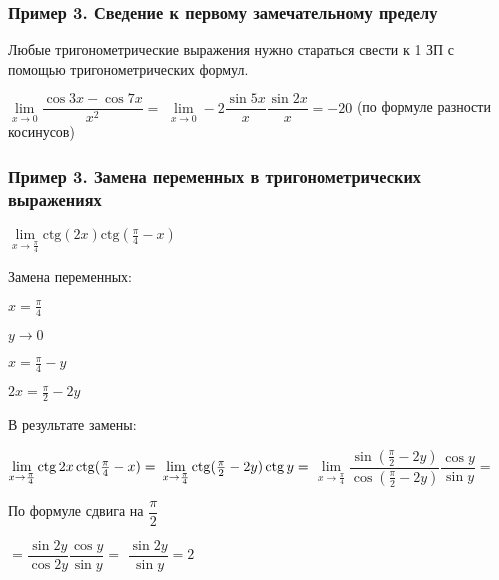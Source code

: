 \subsubsection{Пример 3. Сведение к первому замечательному пределу}

Любые тригонометрические выражения нужно стараться свести к
1 ЗП с помощью тригонометрических формул.

$ \lim\limits_{x\to 0} \dfrac{ \cos{3x} - \cos{7x}}{x^{2}} = $
$ \lim\limits_{x\to 0} -2 \dfrac{\sin{5x}}{x} \dfrac{\sin{2x}}{x} = -20 $
(по формуле разности косинусов)

\subsubsection{Пример 3. Замена переменных в тригонометрических выражениях}

$ \lim\limits_{x\to \frac{\pi}{4} } \mathrm{ctg}(2x)  \mathrm{ctg}( \frac{\pi}{4} - x)  $

Замена переменных:

$ x = \frac{\pi}{4} $

$ y \to 0 $

$ x = \frac{\pi}{4} - y $

$ 2x = \frac{\pi}{2} - 2y $

В результате замены:

$ \lim\limits_{x\to \frac{\pi}{4} } \operatorname{ctg}{2x}   \operatorname{ctg}( \frac{\pi}{4} - x) = $
$ \lim\limits_{x\to \frac{\pi}{4} } \operatorname{ctg}(\frac{\pi}{2} - 2y)  \operatorname{ctg}{y} = $
$ \lim\limits_{x\to \frac{\pi}{4} } 
\dfrac{\sin(\frac{\pi}{2} - 2y)}{\cos(\frac{\pi}{2} - 2y)}
\dfrac{\cos{y} }{\sin{y} } = $

По формуле сдвига на $ \dfrac{\pi}{2} $ 

$ = \dfrac{\sin{2y} }{\cos{2y} } \dfrac{\cos{y} }{\sin{y} } = $
$ \dfrac{\sin{2y} }{\sin{y} } = 2 $
